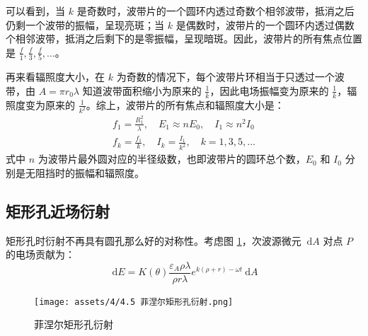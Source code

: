 \documentclass[UTF8]{report}
\theoremstyle{MyLineTheoremStyle} %
\theoremstyle{MyBlockTheoremStyle} %
\theoremstyle{MySubsubsectionStyle} %
\begin{document}
可以看到，当 $k$ 是奇数时，波带片的一个圆环内透过奇数个相邻波带，抵消之后仍剩一个波带的振幅，呈现亮斑；当 $k$ 是偶数时，波带片的一个圆环内透过偶数个相邻波带，抵消之后剩下的是零振幅，呈现暗斑。因此，波带片的所有焦点位置是 $\frac{f}{1}, \frac{f}{3}, \frac{f}{5}, ...$。

再来看辐照度大小，在 $k$ 为奇数的情况下，每个波带片环相当于只透过一个波带，由 $A = \pi r_0 \lambda$ 知道波带面积缩小为原来的 $\frac{1}{k}$，因此电场振幅变为原来的 $\frac{1}{k}$，辐照度变为原来的 $\frac{1}{k^2}$。综上，波带片的所有焦点和辐照度大小是：
\begin{gather}
f_1 = \frac{R_1^2}{\lambda},\quad   E_1 \approx n E_0 ,\quad   I_1 \approx n^2 I_0 \\
f_k = \frac{f_1}{k},\quad I_k = \frac{I_1}{k^2},\quad k = 1, 3, 5, ...
\end{gather}
式中 $n$ 为波带片最外圆对应的半径级数，也即波带片的圆环总个数，$E_0$ 和 $I_0$ 分别是无阻挡时的振幅和辐照度。


\subsection{矩形孔近场衍射}

矩形孔时衍射不再具有圆孔那么好的对称性。考虑图 \ref{菲涅尔矩形孔衍射}，次波源微元 $\ \mathrm{d} A$ 对点 $P$ 的电场贡献为：
\begin{equation}
\ \mathrm{d}E = K(\theta)\frac{\varepsilon_A \rho \lambda}{\rho r \lambda} e^{k(\rho + r) - \omega t} \ \mathrm{d}A
\end{equation}
\begin{figure}[H]\centering
    \texttt{[image: assets/4/4.5 菲涅尔矩形孔衍射.png]}
    \caption{菲涅尔矩形孔衍射}\label{菲涅尔矩形孔衍射}
\end{figure}
\end{document}
